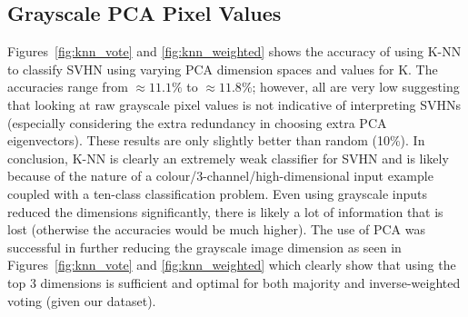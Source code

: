\documentclass{article} %
\begin{document}
\subsection{Grayscale PCA Pixel Values}
Figures~\ref{fig:knn_vote} and \ref{fig:knn_weighted} shows the accuracy of using K-NN to classify SVHN using varying PCA dimension spaces and values for K. The accuracies range from $\approx 11.1\%$ to $\approx 11.8\%$; however, all are very low suggesting that looking at raw grayscale pixel values is not indicative of interpreting SVHNs (especially considering the extra redundancy in choosing extra PCA eigenvectors).  These results are only slightly better than random (10\%).  In conclusion, K-NN is clearly an extremely weak classifier for SVHN and is likely because of the nature of a colour/3-channel/high-dimensional input example coupled with a ten-class classification problem.  Even using grayscale inputs reduced the dimensions significantly, there is likely a lot of information that is lost (otherwise the accuracies would be much higher).  The use of PCA was successful in further reducing the grayscale image dimension as seen in Figures~\ref{fig:knn_vote} and \ref{fig:knn_weighted} which clearly show that using the top 3 dimensions is sufficient and optimal for both majority and inverse-weighted voting (given our dataset).
\end{document}
